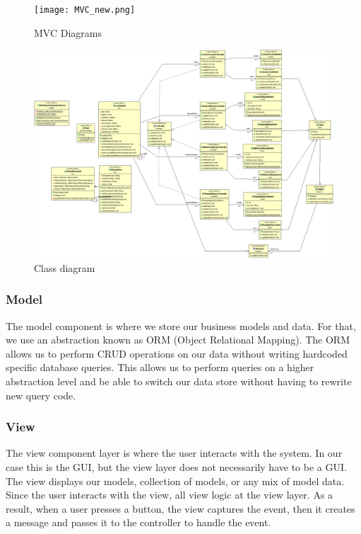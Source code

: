 \documentclass[12pt]{article}
\begin{document}
\begin{figure}[h!]
  \centering
  \texttt{[image: MVC\_new.png]}
  \caption{MVC Diagrams}
\end{figure}

\begin{landscape}
\begin{figure}[h!]
  \centering
  \includegraphics[width=250mm]{class_diagram.png}
  \caption{Class diagram}
\end{figure}
\end{landscape}



\subsubsection{Model}
The model component is where we store our business models and data. For that, we use an abstraction known as ORM (Object Relational Mapping). The ORM allows us to perform CRUD operations on our data without writing hardcoded specific database queries. This allows us to perform queries on a higher abstraction level and be able to switch our data store without having to rewrite new query code. 


\subsubsection{View}
The view component layer is where the user interacts with the system. In our case this is the GUI, but the view layer does not necessarily have to be a GUI. The view displays our models, collection of models, or any mix of model data. Since the user interacts with the view, all view logic at the view layer. As a result, when a user presses a button, the view captures the event, then it creates a message and passes it to the controller to handle the event.  
\end{document}
